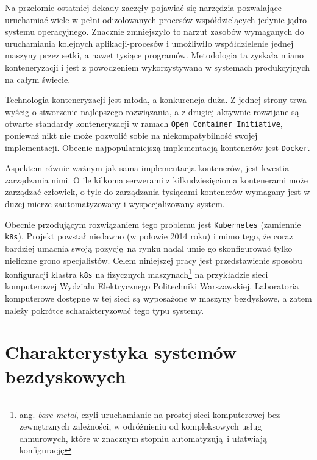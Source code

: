\documentclass[a4paper,12pt,twoside,openany]{report}
\newcommand{\passthrough}[1]{#1}
\renewcommand{\href}[2]{#2\endnote{\url{#1}}}
\begin{document}
Na przełomie ostatniej dekady zaczęły pojawiać się narzędzia pozwalające
uruchamiać wiele w pełni odizolowanych procesów współdzielących jedynie
jądro systemu operacyjnego. Znacznie zmniejszyło to narzut zasobów
wymaganych do uruchamiania kolejnych aplikacji-procesów i umożliwiło
współdzielenie jednej maszyny przez setki, a nawet tysiące programów.
Metodologia ta zyskała miano konteneryzacji i jest z powodzeniem
wykorzystywana w systemach produkcyjnych na całym świecie.

Technologia konteneryzacji jest młoda, a konkurencja duża. Z jednej
strony trwa wyścig o stworzenie najlepszego rozwiązania, a z drugiej
aktywnie rozwijane są~ otwarte standardy konteneryzacji w ramach
\href{https://www.opencontainers.org/about}{\passthrough{\lstinline!Open Container Initiative!}},
ponieważ nikt nie może pozwolić sobie na niekompatybilność swojej
implementacji. Obecnie najpopularniejszą implementacją kontenerów jest
\passthrough{\lstinline!Docker!}.

Aspektem równie ważnym jak sama implementacja kontenerów, jest kwestia
zarządzania nimi. O ile kilkoma serwerami z kilkudziesięcioma
kontenerami może zarządzać człowiek, o tyle do zarządzania tysiącami
kontenerów wymagany jest w dużej mierze zautomatyzowany i
wyspecjalizowany system.

Obecnie przodującym rozwiązaniem tego problemu jest
\passthrough{\lstinline!Kubernetes!} (zamiennie
\passthrough{\lstinline!k8s!}). Projekt powstał niedawno (w połowie 2014
roku) i mimo tego, że coraz bardziej umacnia swoją pozycję~na rynku
nadal umie go skonfigurować tylko nieliczne grono specjalistów. Celem
niniejszej pracy jest przedstawienie sposobu konfiguracji klastra
\passthrough{\lstinline!k8s!} na fizycznych maszynach\footnote{ang.
  \emph{bare metal}, czyli uruchamianie na prostej sieci komputerowej
  bez zewnętrznych zależności, w odróżnieniu od kompleksowych usług
  chmurowych, które w znacznym stopniu automatyzują~i ułatwiają
  konfigurację} na przykładzie sieci komputerowej Wydziału Elektrycznego
Politechniki Warszawskiej. Laboratoria komputerowe dostępne w tej sieci
są wyposażone w maszyny bezdyskowe, a zatem należy pokrótce
scharakteryzować tego typu systemy.

\hypertarget{charakterystyka-systemuxf3w-bezdyskowych}{%
\section{Charakterystyka systemów
bezdyskowych}\label{charakterystyka-systemuxf3w-bezdyskowych}}
\end{document}
